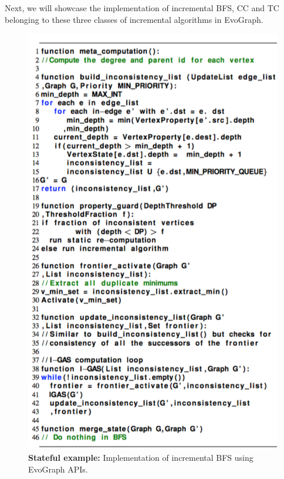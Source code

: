 Next, we will showcase the implementation of incremental BFS, CC and TC belonging to these three classes of incremental algorithms in EvoGraph.


\begin{figure}[!t]
\centering
\includegraphics [width=\textwidth,height=0.85\textheight,keepaspectratio]{figures/BFS-inc.pdf}
\caption{\textbf{Stateful example:} Implementation of incremental BFS using EvoGraph APIs. }
\label{fig:BFS-inc}
\end{figure}




